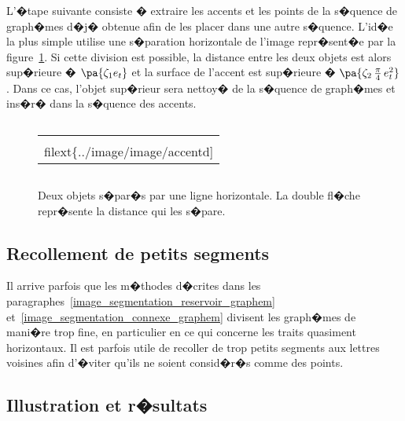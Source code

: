 L'�tape suivante consiste � extraire les accents et les points de la s�quence de graph�mes d�j� obtenue afin de les placer dans une autre s�quence. L'id�e la plus simple utilise une s�paration horizontale de l'image repr�sent�e par la figure~\ref{image_graphem_valley_accent_d}. Si cette division est possible, la distance entre les deux objets est alors sup�rieure � $\pa{\zeta_1 e_t}$ et la surface de l'accent est sup�rieure � $\pa{\zeta_2 \,\frac{\pi}{4} \, e_t^2}$. Dans ce cas, l'objet sup�rieur sera nettoy� de la s�quence de graph�mes et ins�r� dans la s�quence des accents.


            \begin{figure}[ht]
        $$\begin{tabular}{|c|} \hline
        \texttt{[image: \\filext\{../image/image/accentd]}} \\ \hline
        \end{tabular}$$
        \caption{    Deux objets s�par�s par une ligne horizontale. 
                            La double fl�che repr�sente la distance qui les s�pare. }
        \label{image_graphem_valley_accent_d}
            \end{figure}
            




\subsection{Recollement de petits segments}

Il arrive parfois que les m�thodes d�crites dans les paragraphes~\ref{image_segmentation_reservoir_graphem} et~\ref{image_segmentation_connexe_graphem} divisent les graph�mes de mani�re trop fine, en particulier en ce qui concerne les traits quasiment horizontaux. Il est parfois utile de recoller de trop petits segments aux lettres voisines afin d'�viter qu'ils ne soient consid�r�s comme des points.








\subsection{Illustration et r�sultats}
\label{image_illustration_resultat}


